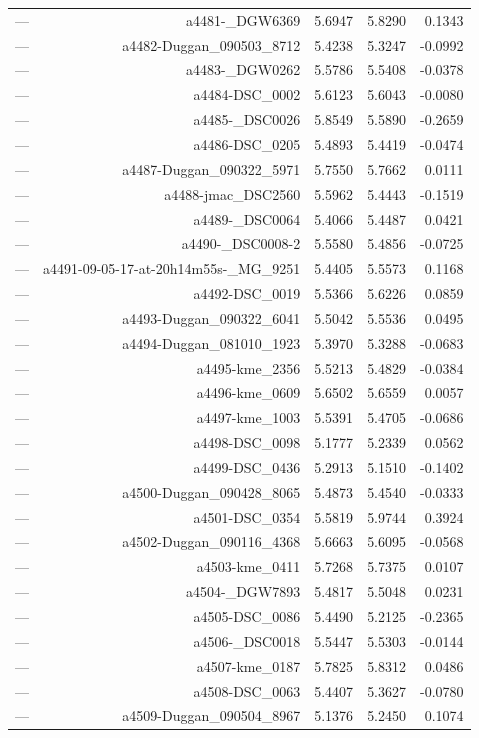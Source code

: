 \begin{table}[htbp]
\begin{tabular}{lrrrr}
— & a4481-_DGW6369 & 5.6947 & 5.8290 & 0.1343 \\
— & a4482-Duggan_090503_8712 & 5.4238 & 5.3247 & -0.0992 \\
— & a4483-_DGW0262 & 5.5786 & 5.5408 & -0.0378 \\
— & a4484-DSC_0002 & 5.6123 & 5.6043 & -0.0080 \\
— & a4485-_DSC0026 & 5.8549 & 5.5890 & -0.2659 \\
— & a4486-DSC_0205 & 5.4893 & 5.4419 & -0.0474 \\
— & a4487-Duggan_090322_5971 & 5.7550 & 5.7662 & 0.0111 \\
— & a4488-jmac_DSC2560 & 5.5962 & 5.4443 & -0.1519 \\
— & a4489-_DSC0064 & 5.4066 & 5.4487 & 0.0421 \\
— & a4490-_DSC0008-2 & 5.5580 & 5.4856 & -0.0725 \\
— & a4491-09-05-17-at-20h14m55s-_MG_9251 & 5.4405 & 5.5573 & 0.1168 \\
— & a4492-DSC_0019 & 5.5366 & 5.6226 & 0.0859 \\
— & a4493-Duggan_090322_6041 & 5.5042 & 5.5536 & 0.0495 \\
— & a4494-Duggan_081010_1923 & 5.3970 & 5.3288 & -0.0683 \\
— & a4495-kme_2356 & 5.5213 & 5.4829 & -0.0384 \\
— & a4496-kme_0609 & 5.6502 & 5.6559 & 0.0057 \\
— & a4497-kme_1003 & 5.5391 & 5.4705 & -0.0686 \\
— & a4498-DSC_0098 & 5.1777 & 5.2339 & 0.0562 \\
— & a4499-DSC_0436 & 5.2913 & 5.1510 & -0.1402 \\
— & a4500-Duggan_090428_8065 & 5.4873 & 5.4540 & -0.0333 \\
— & a4501-DSC_0354 & 5.5819 & 5.9744 & 0.3924 \\
— & a4502-Duggan_090116_4368 & 5.6663 & 5.6095 & -0.0568 \\
— & a4503-kme_0411 & 5.7268 & 5.7375 & 0.0107 \\
— & a4504-_DGW7893 & 5.4817 & 5.5048 & 0.0231 \\
— & a4505-DSC_0086 & 5.4490 & 5.2125 & -0.2365 \\
— & a4506-_DSC0018 & 5.5447 & 5.5303 & -0.0144 \\
— & a4507-kme_0187 & 5.7825 & 5.8312 & 0.0486 \\
— & a4508-DSC_0063 & 5.4407 & 5.3627 & -0.0780 \\
— & a4509-Duggan_090504_8967 & 5.1376 & 5.2450 & 0.1074 \\

\end{tabular}
\end{table}
